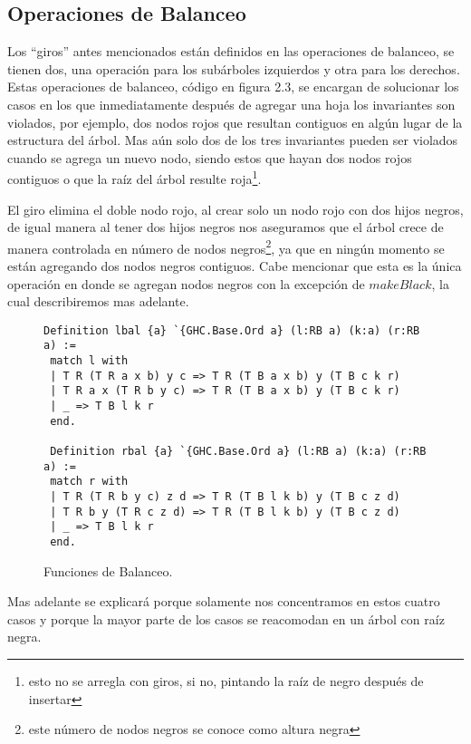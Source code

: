 \documentclass[letterpaper,12pt,oneside]{book}
\theoremstyle{plain}
\theoremstyle{definition}
\theoremstyle{remark}
\begin{document}
\subsection{Operaciones de Balanceo}
Los ``giros'' antes mencionados están definidos en las operaciones de balanceo, se tienen dos, una 
operaci\'on para los subárboles izquierdos y otra para los derechos. Estas operaciones de balanceo, 
c\'odigo en figura 2.3, se encargan de solucionar los casos en los que inmediatamente después de 
agregar una hoja los invariantes son violados, por ejemplo, dos nodos rojos que resultan contiguos en 
algún lugar de la estructura del \'arbol. Mas a\'un solo dos de los tres invariantes pueden ser violados 
cuando se agrega un nuevo nodo, siendo estos que hayan dos nodos rojos contiguos o que la raíz del árbol 
resulte roja\footnote{esto no se arregla con giros, si no, pintando la raíz de negro después de 
insertar}.

El giro elimina el doble nodo rojo, al crear solo un nodo rojo con dos hijos negros, de igual manera al 
tener dos hijos negros nos aseguramos que el árbol crece de manera controlada en n\'umero de nodos 
negros\footnote{este n\'umero de nodos negros se conoce como altura negra}, ya que en ningún momento se 
están agregando dos nodos negros contiguos. Cabe mencionar que esta es la única operación en donde se 
agregan nodos negros con la excepción de $makeBlack$, la cual describiremos mas adelante.
\begin{figure}
\centering 
\captionsetup{justification=centering}
\begin{verbatim}
Definition lbal {a} `{GHC.Base.Ord a} (l:RB a) (k:a) (r:RB a) :=
 match l with
 | T R (T R a x b) y c => T R (T B a x b) y (T B c k r)
 | T R a x (T R b y c) => T R (T B a x b) y (T B c k r)
 | _ => T B l k r
 end.

 Definition rbal {a} `{GHC.Base.Ord a} (l:RB a) (k:a) (r:RB a) :=
 match r with
 | T R (T R b y c) z d => T R (T B l k b) y (T B c z d)
 | T R b y (T R c z d) => T R (T B l k b) y (T B c z d)
 | _ => T B l k r
 end.
\end{verbatim}
\caption{Funciones de Balanceo.}
\end{figure}

Mas adelante se explicar\'a porque solamente nos concentramos en estos cuatro casos y porque la mayor 
parte de los casos se reacomodan en un \'arbol con ra\'iz negra.
\end{document}
